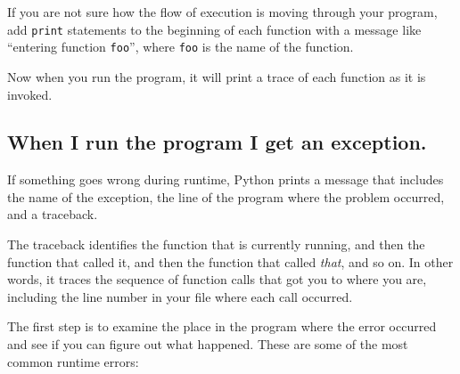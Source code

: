 If you are not sure how the flow of execution is moving through
your program, add {\tt print} statements to the beginning of each
function with a message like ``entering function {\tt foo}'', where
{\tt foo} is the name of the function.

Now when you run the program, it will print a trace of each
function as it is invoked.


\subsection{When I run the program I get an exception.}

If something goes wrong during runtime, Python
prints a message that includes the name of the
exception, the line of the program where the problem occurred,
and a traceback.

The traceback identifies the function that is currently running, and
then the function that called it, and then the function that called
{\em that}, and so on.  In other words, it traces the sequence of
function calls that got you to where you are, including the line
number in your file where each call occurred.

The first step is to examine the place in the program where
the error occurred and see if you can figure out what happened.
These are some of the most common runtime errors:

